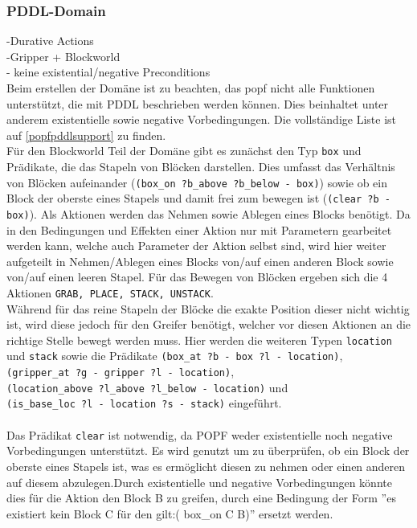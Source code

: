 \subsubsection{PDDL-Domain}
-Durative Actions\\
-Gripper + Blockworld\\
- keine existential/negative Preconditions\\
Beim erstellen der Domäne ist zu beachten, das \ac{popf} nicht alle Funktionen unterstützt, die mit PDDL beschrieben werden können. Dies beinhaltet unter anderem existentielle sowie negative Vorbedingungen. Die vollständige Liste ist auf \ref{popfpddlsupport} zu finden.\\
Für den Blockworld Teil der Domäne gibt es zunächst den Typ \verb|box| und Prädikate, die das Stapeln von Blöcken darstellen. Dies umfasst das Verhältnis von Blöcken aufeinander (\verb|(box_on ?b_above ?b_below - box)|) sowie ob ein Block der oberste eines Stapels und damit frei zum bewegen ist (\verb|(clear ?b - box)|). Als Aktionen werden das Nehmen sowie Ablegen eines Blocks benötigt. Da in den Bedingungen und Effekten einer Aktion nur mit Parametern gearbeitet werden kann, welche auch Parameter der Aktion selbst sind, wird hier weiter aufgeteilt in Nehmen/Ablegen eines Blocks von/auf einen anderen Block sowie von/auf einen leeren Stapel. Für das Bewegen von Blöcken ergeben sich die 4 Aktionen \verb|GRAB, PLACE, STACK, UNSTACK|.\\
Während für das reine Stapeln der Blöcke die exakte Position dieser nicht wichtig ist, wird diese jedoch für den Greifer benötigt, welcher vor diesen Aktionen an die richtige Stelle bewegt werden muss. Hier werden die weiteren Typen \verb|location| und \verb|stack| sowie die Prädikate \verb|(box_at ?b - box ?l - location)|,\\ \verb|(gripper_at ?g - gripper ?l - location)|,\\ \verb|(location_above ?l_above ?l_below - location)| und\\ \verb|(is_base_loc ?l - location ?s - stack)| eingeführt.\\ \\
Das Prädikat \verb|clear| ist notwendig, da \ac{POPF} weder existentielle noch negative Vorbedingungen unterstützt. Es wird genutzt um zu überprüfen, ob ein Block der oberste eines Stapels ist, was es ermöglicht diesen zu nehmen oder einen anderen auf diesem abzulegen.Durch existentielle und negative Vorbedingungen könnte dies für die Aktion den Block B zu greifen, durch eine Bedingung der Form ''es existiert kein Block C für den gilt:( box\_on C B)'' ersetzt werden. \\ \\
